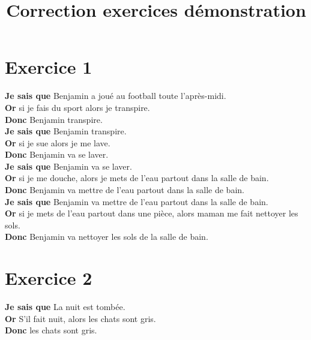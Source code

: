 \documentclass[12pt,a4paper]{article}
\date{}
\title{Correction exercices démonstration}
\begin{document}
	
\maketitle

\vspace*{-3cm}
%
%


%

\section*{Exercice 1}

\noindent \textbf{Je sais que} Benjamin a joué au football toute l'après-midi.\\
\textbf{Or} si je fais du sport alors je transpire.\\
\textbf{Donc} Benjamin transpire.\\

\noindent \textbf{Je sais que} Benjamin transpire.\\
\textbf{Or} si je sue alors je me lave.\\
\textbf{Donc} Benjamin va se laver.\\

\noindent \textbf{Je sais que} Benjamin va se laver.\\
\textbf{Or} si je me douche, alors je mets de l’eau partout dans la salle de bain.\\
\textbf{Donc} Benjamin va mettre de l'eau partout dans la salle de bain.\\

\noindent \textbf{Je sais que} Benjamin va mettre de l'eau partout dans la salle de bain.\\
\textbf{Or} si je mets de l’eau partout dans une pièce, alors maman me fait nettoyer les sols.\\
\textbf{Donc} Benjamin va nettoyer les sols de la salle de bain.\\

\section*{Exercice 2}

\noindent \textbf{Je sais que} La nuit est tombée.\\
\textbf{Or} S’il fait nuit, alors les chats sont gris.\\
\textbf{Donc} les chats sont gris.\\
\end{document}
